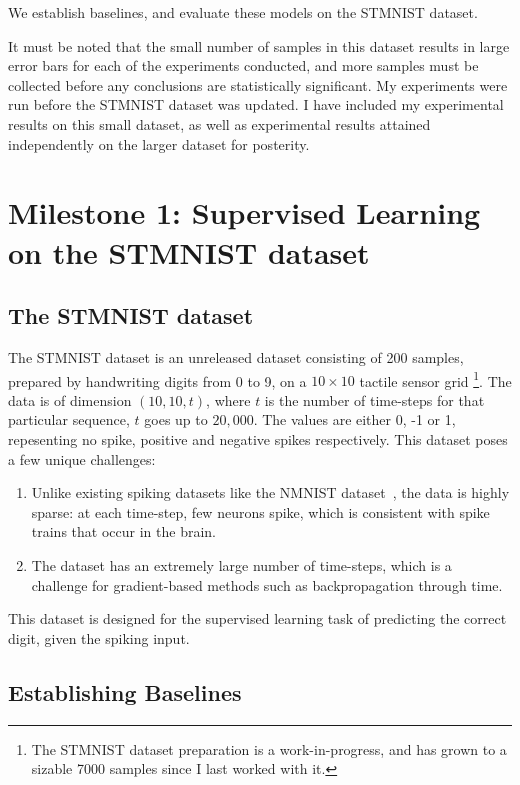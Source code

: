 \documentclass[fyp]{socreport}
\begin{document}
We establish baselines, and evaluate these models on the STMNIST dataset.

It must be noted that the small number of samples in this dataset results in
large error bars for each of the experiments conducted, and more samples must be
collected before any conclusions are statistically significant. My experiments
were run before the STMNIST dataset was updated. I have included my experimental
results on this small dataset, as well as experimental results attained
independently on the larger dataset for posterity.

\section{Milestone 1: Supervised Learning on the STMNIST dataset}

\subsection{The STMNIST dataset}

The STMNIST dataset is an unreleased dataset consisting of 200 samples, prepared
by handwriting digits from 0 to 9, on a $10 \times 10$ tactile sensor grid
\footnote{The STMNIST dataset preparation is a work-in-progress, and has grown
  to a sizable 7000 samples since I last worked with it.}. The data is of
dimension \((10, 10, t)\), where \(t\) is the number of time-steps for that
particular sequence, \(t\) goes up to \(20,000\). The values are either 0, -1 or
1, repesenting no spike, positive and negative spikes respectively. This dataset
poses a few unique challenges:

\begin{enumerate}
\item Unlike existing spiking datasets like the NMNIST
dataset~\cite{10.3389/fnins.2015.00481}, the data is highly sparse: at each
time-step, few neurons spike, which is consistent with spike trains that occur
in the brain.
\item The dataset has an extremely large number of time-steps, which is a
challenge for gradient-based methods such as backpropagation through time.
\end{enumerate}

This dataset is designed for the supervised learning task of predicting the
correct digit, given the spiking input.

\subsection{Establishing Baselines}
\end{document}
